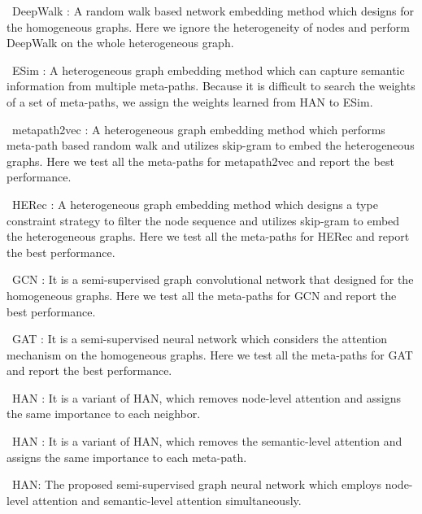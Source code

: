 \textbullet\  DeepWalk \cite{perozzi2014deepwalk}:
	A random walk based network embedding method which designs for the homogeneous graphs. 
	Here we ignore the heterogeneity of nodes and perform DeepWalk on the whole heterogeneous graph. 


\textbullet\   ESim \cite{Shang2016MetaPathGE}: 
	A 
heterogeneous graph embedding method which can capture semantic information from multiple meta-paths. 
	Because it is difficult to search the weights of a set of meta-paths, we assign the weights learned from HAN to ESim. 


\textbullet\  metapath2vec  \cite{Dong2017metapath2vecSR}: 
	A 
	heterogeneous graph
embedding method which performs meta-path based random walk and utilizes skip-gram to embed the heterogeneous graphs. 
Here we test all the meta-paths for metapath2vec and report the best performance.




\textbullet\  HERec \cite{HERec}:
	A heterogeneous graph embedding method which designs a type constraint strategy to filter the node sequence
and utilizes skip-gram to embed the heterogeneous graphs. 
Here we test all the meta-paths for HERec and report the best performance.




\textbullet\   GCN \cite{gcn}:
	It is a semi-supervised graph convolutional network that designed for the homogeneous graphs. 
Here we test all the meta-paths for GCN and report the best performance.
	


\textbullet\   GAT \cite{gat}:
	It is a semi-supervised neural network which considers the attention mechanism on the homogeneous graphs. 
Here we test all the meta-paths for GAT and report the best performance.
	


	
\textbullet\   HAN  : 
	It is a variant of HAN, which removes node-level attention and assigns the same importance to each neighbor.


\textbullet\  HAN  : 
	It is a variant of HAN, which removes the semantic-level attention and assigns  the same importance to each meta-path.


\textbullet\  HAN: 
The proposed semi-supervised graph neural network
which employs node-level attention and semantic-level attention simultaneously.
	









